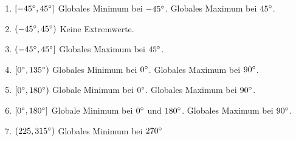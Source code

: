 \item 

\begin{enumerate}
	\item $[-\SI{45}{\degree},\SI{45}{\degree}]$ Globales Minimum bei $-\SI{45}{\degree}$. Globales Maximum bei $\SI{45}{\degree}$.
	\item $(-\SI{45}{\degree},\SI{45}{\degree})$ Keine Extremwerte.
	\item $(-\SI{45}{\degree},\SI{45}{\degree}]$ Globales Maximum bei $\SI{45}{\degree}$.
	\item $[\SI{0}{\degree},\SI{135}{\degree})$ Globales Minimum bei $\SI{0}{\degree}$. Globales Maximum bei $\SI{90}{\degree}$.
	\item $[\SI{0}{\degree},\SI{180}{\degree})$ Globale Minimum bei $\SI{0}{\degree}$. Globales Maximum bei $\SI{90}{\degree}$.
	\item $[\SI{0}{\degree},\SI{180}{\degree}]$ Globale Minimum bei $\SI{0}{\degree}$ und $\SI{180}{\degree}$. Globales Maximum bei $\SI{90}{\degree}$.
	\item $(225,\SI{315}{\degree})$ Globales Minimum bei $\SI{270}{\degree}$
\end{enumerate}
